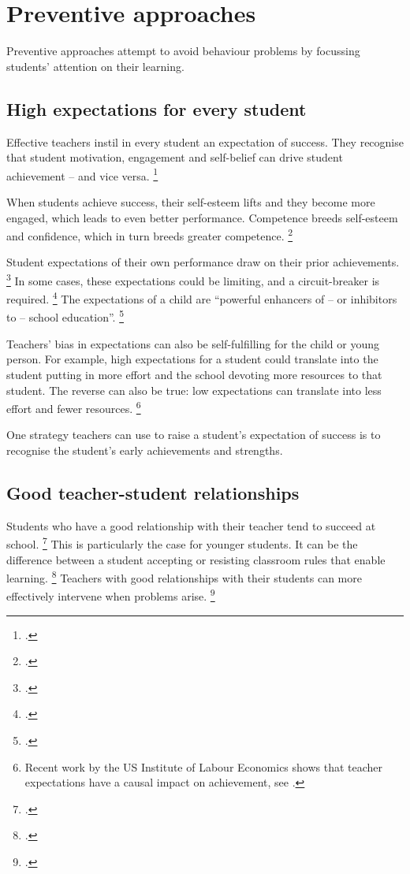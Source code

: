 \documentclass{grattan}
\begin{document}
\section{Preventive approaches}\label{sec:preventive-approaches}
Preventive approaches attempt to avoid behaviour problems by focussing students' attention on their learning.

\subsection{High expectations for every student}\label{subsec:high-expectations-every-student}
Effective teachers instil in every student an expectation of success. They recognise that student motivation, engagement and self-belief can drive student achievement -- and vice versa.%
    \footcite{OECD2013PISA2012ResultsReadyToLearn}

When students achieve success, their self-esteem lifts and they become more engaged, which leads to even better performance. Competence breeds self-esteem and confidence, which in turn breeds greater competence.%
    \footcites{Brophy2013MotivatingStudentsLearn}{Porter2007StudentBehaviourTheory}

Student expectations of their own performance draw on their prior achievements.%
    \footcite{Hattie2008visiblelearningsynthesis}
In some cases, these expectations could be limiting, and a circuit-breaker is required.%
    \footcite{Hattie2008visiblelearningsynthesis}
The expectations of a child are ``powerful enhancers of -- or inhibitors to -- school education''.%
    \footcite[][31]{Hattie2008visiblelearningsynthesis}

Teachers' bias in expectations can also be self-fulfilling for the child or young person. For example, high expectations for a student could translate into the student putting in more effort and the school devoting more resources to that student. The reverse can also be true: low expectations can translate into less effort and fewer resources.%
    \footnote{Recent work by the US Institute of Labour Economics shows that teacher expectations have a causal impact on achievement, see \textcite{PapageorgeGershenson2016TeacherExpectationsMatter}.}

One strategy teachers can use to raise a student's expectation of success is to recognise the student's early achievements and strengths.

\subsection{Good teacher-student relationships}\label{subsec:teacher-student-relationships}
Students who have a good relationship with their teacher tend to succeed at school.%
    \footcites{Hattie2008visiblelearningsynthesis}{Marzano2003ClassroomManagementWorks}
This is particularly the case for younger students. It can be the difference between a student accepting or resisting classroom rules that enable learning.%
    \footcite{Marzano2003ClassroomManagementWorks}
Teachers with good relationships with their students can more effectively intervene when problems arise.%
\footcites{Epstein2008ReducingBehaviorProblems}{Marzano2003ClassroomManagementWorks}{Montuoro2015StudentPerceptionsMisbehaviour}
\end{document}
